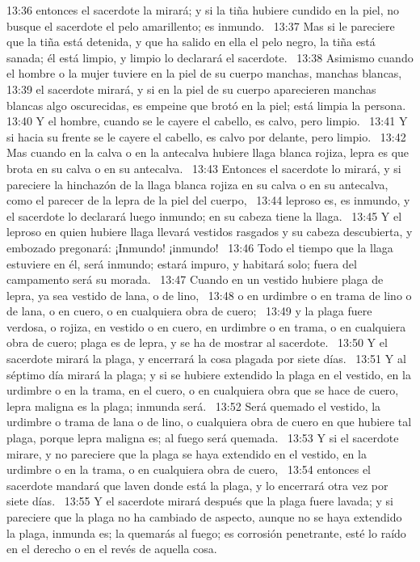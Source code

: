 13:36 entonces el sacerdote la mirará; y si la tiña hubiere cundido en la piel, no busque el sacerdote el pelo amarillento; es inmundo.  
13:37 Mas si le pareciere que la tiña está detenida, y que ha salido en ella el pelo negro, la tiña está sanada; él está limpio, y limpio lo declarará el sacerdote.  
13:38 Asimismo cuando el hombre o la mujer tuviere en la piel de su cuerpo manchas, manchas blancas,  
13:39 el sacerdote mirará, y si en la piel de su cuerpo aparecieren manchas blancas algo oscurecidas, es empeine que brotó en la piel; está limpia la persona.  
13:40 Y el hombre, cuando se le cayere el cabello, es calvo, pero limpio.  
13:41 Y si hacia su frente se le cayere el cabello, es calvo por delante, pero limpio.  
13:42 Mas cuando en la calva o en la antecalva hubiere llaga blanca rojiza, lepra es que brota en su calva o en su antecalva.  
13:43 Entonces el sacerdote lo mirará, y si pareciere la hinchazón de la llaga blanca rojiza en su calva o en su antecalva, como el parecer de la lepra de la piel del cuerpo,  
13:44 leproso es, es inmundo, y el sacerdote lo declarará luego inmundo; en su cabeza tiene la llaga.  
13:45 Y el leproso en quien hubiere llaga llevará vestidos rasgados y su cabeza descubierta, y embozado pregonará: ¡Inmundo! ¡inmundo!  
13:46 Todo el tiempo que la llaga estuviere en él, será inmundo; estará impuro, y habitará solo; fuera del campamento será su morada.  
13:47 Cuando en un vestido hubiere plaga de lepra, ya sea vestido de lana, o de lino,  
13:48 o en urdimbre o en trama de lino o de lana, o en cuero, o en cualquiera obra de cuero;  
13:49 y la plaga fuere verdosa, o rojiza, en vestido o en cuero, en urdimbre o en trama, o en cualquiera obra de cuero; plaga es de lepra, y se ha de mostrar al sacerdote.  
13:50 Y el sacerdote mirará la plaga, y encerrará la cosa plagada por siete días.  
13:51 Y al séptimo día mirará la plaga; y si se hubiere extendido la plaga en el vestido, en la urdimbre o en la trama, en el cuero, o en cualquiera obra que se hace de cuero, lepra maligna es la plaga; inmunda será.  
13:52 Será quemado el vestido, la urdimbre o trama de lana o de lino, o cualquiera obra de cuero en que hubiere tal plaga, porque lepra maligna es; al fuego será quemada.  
13:53 Y si el sacerdote mirare, y no pareciere que la plaga se haya extendido en el vestido, en la urdimbre o en la trama, o en cualquiera obra de cuero,  
13:54 entonces el sacerdote mandará que laven donde está la plaga, y lo encerrará otra vez por siete días.  
13:55 Y el sacerdote mirará después que la plaga fuere lavada; y si pareciere que la plaga no ha cambiado de aspecto, aunque no se haya extendido la plaga, inmunda es; la quemarás al fuego; es corrosión penetrante, esté lo raído en el derecho o en el revés de aquella cosa.  

